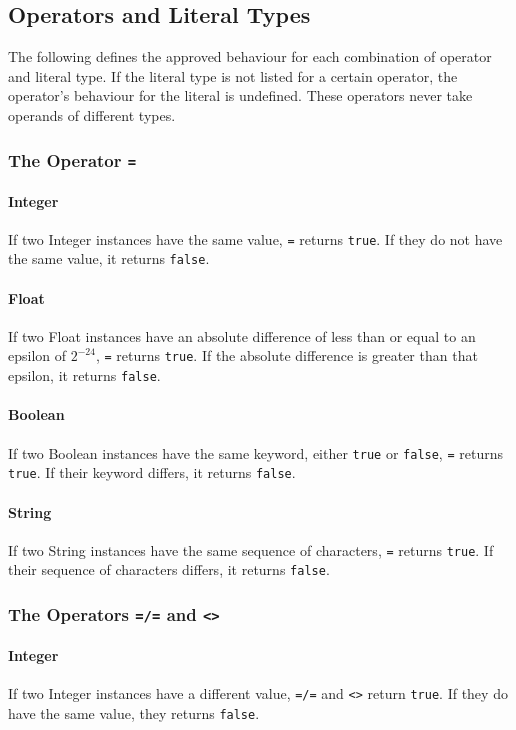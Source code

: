 \subsection{Operators and Literal Types}
The following defines the approved behaviour for each combination of operator and literal type. If the literal type is not listed for a certain operator, the operator's behaviour for the literal is undefined. These operators never take operands of different types.
\subsubsection{The Operator {\tt =}}
\paragraph{Integer}
If two Integer instances have the same value, \verb!=! returns \verb!true!. If they do not have the same value, it returns \verb!false!.
\paragraph{Float}
If two Float instances have an absolute difference of less than or equal to an epsilon of $2^{-24}$, \verb!=! returns \verb!true!. If the absolute difference is greater than that epsilon, it returns \verb!false!.
\paragraph{Boolean}
If two Boolean instances have the same keyword, either \verb!true! or \verb!false!, \verb!=! returns \verb!true!. If their keyword differs, it returns \verb!false!.
\paragraph{String}
If two String instances have the same sequence of characters, \verb!=! returns \verb!true!. If their sequence of characters differs, it returns \verb!false!.

\subsubsection{The Operators {\tt =/=} and {\tt <>}}
\paragraph{Integer}
If two Integer instances have a different value, \verb!=/=! and \verb!<>! return \verb!true!. If they do have the same value, they returns \verb!false!.
